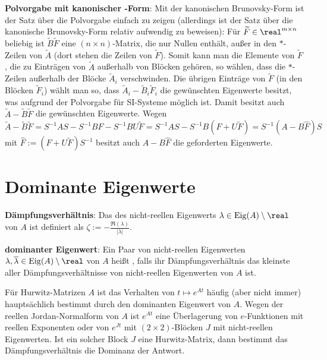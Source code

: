 \textbf{Polvorgabe mit kanonischer -Form}:
Mit der kanonischen Brunovsky-Form ist der Satz über die Polvorgabe einfach zu zeigen
(allerdings ist der Satz über die kanonische Brunovsky-Form relativ aufwendig zu beweisen):
Für $\widetilde{F} \in \real^{m \times n}$ beliebig ist $\widetilde{B}\widetilde{F}$
eine $(n \times n)$-Matrix, die nur Nullen enthält, außer in den $\ast$-Zeilen von $\widetilde{A}$
(dort stehen die Zeilen von $\widetilde{F}$).
Somit kann man die Elemente von $\widetilde{F}$, die zu Einträgen von $\widetilde{A}$ außerhalb von
Blöcken gehören, so wählen, dass die $\ast$-Zeilen außerhalb der Blöcke $\widetilde{A}_i$
verschwinden.
Die übrigen Einträge von $\widetilde{F}$ (in den Blöcken $\widetilde{F}_i$) wählt man so, dass
$\widetilde{A}_i - \widetilde{B}_i \widetilde{F}_i$
die gewünschten Eigenwerte besitzt, was aufgrund der Polvorgabe für SI-Systeme möglich ist.
Damit besitzt auch $\widetilde{A} - \widetilde{B} \widetilde{F}$ die gewünschten Eigenwerte.
Wegen\\
$\widetilde{A} - \widetilde{B} \widetilde{F}
= S^{-1}AS - S^{-1}BF - S^{-1}BU \widetilde{F}
= S^{-1}AS - S^{-1}B(F + U\widetilde{F})
= S^{-1} (A - B\widehat{F}) S$
mit $\widehat{F} := (F + U\widetilde{F}) S^{-1}$
besitzt auch $A - B\widehat{F}$ die geforderten Eigenwerte.

\pagebreak

\section{%
    Dominante Eigenwerte%
}

\textbf{Dämpfungsverhältnis}:
Das  des nicht-reellen Eigenwerts
$\lambda \in \Eig(A) \setminus \real$ von $A$ ist definiert als
$\zeta := -\frac{\Re(\lambda)}{|\lambda|}$.

\textbf{dominanter Eigenwert}:
Ein Paar von nicht-reellen Eigenwerten $\lambda, \overline{\lambda} \in \Eig(A) \setminus \real$
von $A$ heißt , falls ihr Dämpfungsverhältnis das kleinste aller
Dämpfungsverhältnisse von nicht-reellen Eigenwerten von $A$ ist.

Für Hurwitz-Matrizen $A$ ist das Verhalten von $t \mapsto e^{At}$ häufig (aber nicht immer)
hauptsächlich bestimmt durch den dominanten Eigenwert von $A$.
Wegen der reellen Jordan-Normalform von $A$ ist $e^{At}$ eine Überlagerung von $e$-Funktionen
mit reellen Exponenten oder von $e^{Jt}$ mit $(2 \times 2)$-Blöcken $J$ mit
nicht-reellen Eigenwerten.
Ist ein solcher Block $J$ eine Hurwitz-Matrix, dann bestimmt das Dämpfungsverhältnis die
Dominanz der Antwort.

